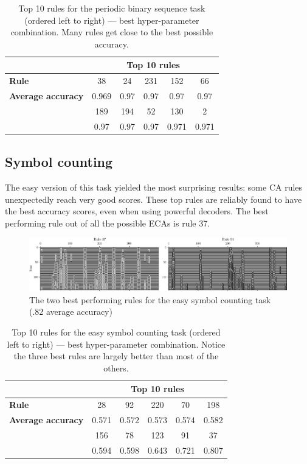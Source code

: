 \begin{table}[htbp]
  \centering
    \begin{tabular}{p{4cm}ccccc}
      \toprule
      & \multicolumn{5}{c}{\bfseries Top 10 rules}\\
      \midrule
      \bfseries Rule & 38 & 24 & 231 & 152 & 66 \\
      \bfseries Average accuracy & 0.969 & 0.97 & 0.97 & 0.97 & 0.97 \\
      \midrule
      \hrulefill & 189 & 194 & 52 & 130 & 2 \\
      \hrulefill & 0.97 & 0.97 & 0.97 & 0.971 & 0.971\\
      \bottomrule
    \end{tabular}
  \caption{Top 10 rules for the periodic binary sequence task (ordered left to
    right) --- best hyper-parameter combination. Many rules get close to the best
    possible accuracy.}\label{tab:top_periodic_rules}
\end{table}

\subsection{Symbol counting}

The easy version of this task yielded the most surprising results: some CA rules
unexpectedly reach very good scores. These top rules are reliably found to have
the best accuracy scores, even when using powerful decoders. The best performing
rule out of all the possible \acp{ECA} is rule 37.

\begin{figure}[htbp]
  \centering
  \includegraphics[width=\linewidth]{figures/rules-sym-ct.pdf}
  \caption{The two best performing rules for the easy symbol counting task (.82
    average accuracy)}\label{fig:best_sym_ct}
\end{figure}

\begin{table}[htbp]
  \centering
    \begin{tabular}{p{4cm}ccccc}
      \toprule
      & \multicolumn{5}{c}{\bfseries Top 10 rules}\\
      \midrule
      \bfseries Rule & 28 & 92 & 220 & 70 & 198\\
      \bfseries Average accuracy & 0.571 & 0.572 & 0.573 & 0.574 & 0.582 \\
      \midrule
      \hrulefill & 156 & 78 & 123 & 91 & 37\\
      \hrulefill & 0.594 & 0.598 & 0.643 & 0.721 & 0.807\\
      \bottomrule
    \end{tabular}
  \caption{Top 10 rules for the easy symbol counting task (ordered left to
    right) --- best hyper-parameter combination. Notice the three best rules are
    largely better than most of the others.}\label{tab:top_sym_ct_rules}
\end{table}


